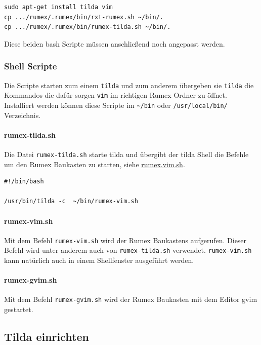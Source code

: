 \documentclass[%
fontsize=12pt,%
parskip=half,%
version=last%
]{scrreprt}
\begin{document}
\begin{verbatim}
sudo apt-get install tilda vim
cp .../rumex/.rumex/bin/rxt-rumex.sh ~/bin/.
cp .../rumex/.rumex/bin/rumex-tilda.sh ~/bin/.
\end{verbatim}

Diese beiden bash Scripte müssen anschließend noch angepasst werden.

\subsubsection{Shell Scripte}\label{shell-scripte}

Die Scripte starten zum einem \texttt{tilda} und zum anderem übergeben
sie \texttt{tilda} die Kommandos die dafür sorgen \texttt{vim} im
richtigen Rumex Ordner zu öffnet. Installiert werden können diese
Scripte im \texttt{\textasciitilde{}/bin} oder \texttt{/usr/local/bin/}
Verzeichnis.

\paragraph{rumex-tilda.sh}\label{rumex-tilda.sh}

Die Datei \texttt{rumex-tilda.sh} starte tilda und übergibt der tilda
Shell die Befehle um den Rumex Baukasten zu starten, siehe
\hyperref[rumex.vim.sh]{rumex.vim.sh}.

\begin{verbatim}
#!/bin/bash

/usr/bin/tilda -c  ~/bin/rumex-vim.sh
\end{verbatim}

\paragraph{rumex-vim.sh}\label{rumex-vim.sh}

Mit dem Befehl \texttt{rumex-vim.sh} wird der Rumex Baukastens
aufgerufen. Dieser Befehl wird unter anderem auch von
\texttt{rumex-tilda.sh} verwendet. \texttt{rumex-vim.sh} kann natürlich
auch in einem Shellfenster ausgeführt werden.

\paragraph{rumex-gvim.sh}\label{rumex-gvim.sh}

Mit dem Befehl \texttt{rumex-gvim.sh} wird der Rumex Baukasten mit dem
Editor gvim gestartet.

\subsection{Tilda einrichten}\label{tilda-einrichten}
\end{document}
